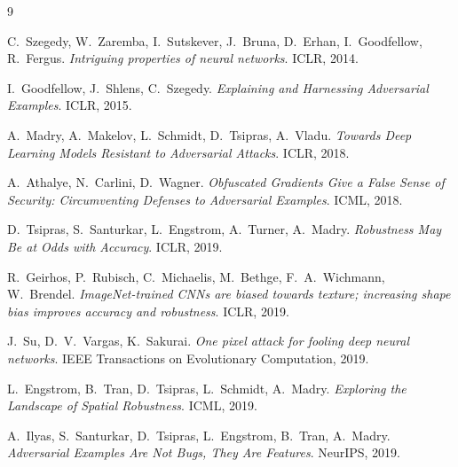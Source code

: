 \documentclass[11pt]{article}
\begin{document}
\begin{thebibliography}{9}

C.~Szegedy, W.~Zaremba, I.~Sutskever, J.~Bruna, D.~Erhan, I.~Goodfellow, R.~Fergus.
\emph{Intriguing properties of neural networks}. ICLR, 2014.

I.~Goodfellow, J.~Shlens, C.~Szegedy.
\emph{Explaining and Harnessing Adversarial Examples}. ICLR, 2015.

A.~Madry, A.~Makelov, L.~Schmidt, D.~Tsipras, A.~Vladu.
\emph{Towards Deep Learning Models Resistant to Adversarial Attacks}. ICLR, 2018.

A.~Athalye, N.~Carlini, D.~Wagner.
\emph{Obfuscated Gradients Give a False Sense of Security: Circumventing Defenses to Adversarial Examples}. ICML, 2018.

D.~Tsipras, S.~Santurkar, L.~Engstrom, A.~Turner, A.~Madry.
\emph{Robustness May Be at Odds with Accuracy}. ICLR, 2019.

R.~Geirhos, P.~Rubisch, C.~Michaelis, M.~Bethge, F.~A.~Wichmann, W.~Brendel.
\emph{ImageNet-trained CNNs are biased towards texture; increasing shape bias improves accuracy and robustness}. ICLR, 2019.

J.~Su, D.~V.~Vargas, K.~Sakurai.
\emph{One pixel attack for fooling deep neural networks}. IEEE Transactions on Evolutionary Computation, 2019.

L.~Engstrom, B.~Tran, D.~Tsipras, L.~Schmidt, A.~Madry.
\emph{Exploring the Landscape of Spatial Robustness}. ICML, 2019.

A.~Ilyas, S.~Santurkar, D.~Tsipras, L.~Engstrom, B.~Tran, A.~Madry.
\emph{Adversarial Examples Are Not Bugs, They Are Features}. NeurIPS, 2019.

\end{thebibliography}
\end{document}
